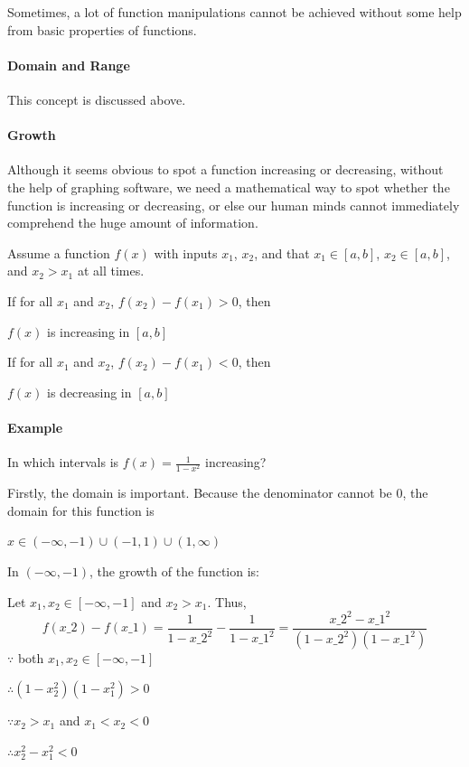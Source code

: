 Sometimes, a lot of function manipulations cannot be achieved without some help from basic properties of functions.

\paragraph{Domain and Range}

This concept is discussed above.

\paragraph{Growth}

Although it seems obvious to spot a function increasing or decreasing, without the help of graphing software, we need a mathematical way to spot whether the function is increasing or decreasing, or else our human minds cannot immediately comprehend the huge amount of information.

Assume a function $f(x)$ with inputs $x_1$, $x_2$, and that $x_1 \in [a,b]$, $x_2 \in [a,b]$, and $x_2 > x_1$ at all times.

If for all $x_1$ and $x_2$, $f(x_2) - f(x_1) > 0$, then

$f(x)$ is increasing in $[a,b]$

If for all $x_1$ and $x_2$, $f(x_2) - f(x_1) < 0$, then

$f(x)$ is decreasing in $[a,b]$

\paragraph{Example}

In which intervals is $f(x) = \frac{1}{1 - x^2}$ increasing?

Firstly, the domain is important. Because the denominator cannot be 0, the domain for this function is

$x \in (-\infty, -1) \cup (-1, 1) \cup (1, \infty)$

In $(-\infty, -1)$, the growth of the function is:

Let $x_1, x_2 \in [-\infty, -1]$ and $x_2 > x_1$. Thus,
$$
f(x\_2) - f(x\_1) = \frac{1}{1 - x\_2^2} - \frac{1}{1 - x\_1^2} = \frac{x\_2^2 - x\_1^2}{(1 - x\_2^2)(1 - x\_1^2)}
$$
$\because$ both $x_1, x_2 \in [-\infty, -1]$

$\therefore (1 - x_2^2)(1 - x_1^2) > 0$

$\because x_2 > x_1$ and $x_1 < x_2 < 0$

$\therefore x_2^2 - x_1^2 < 0$

